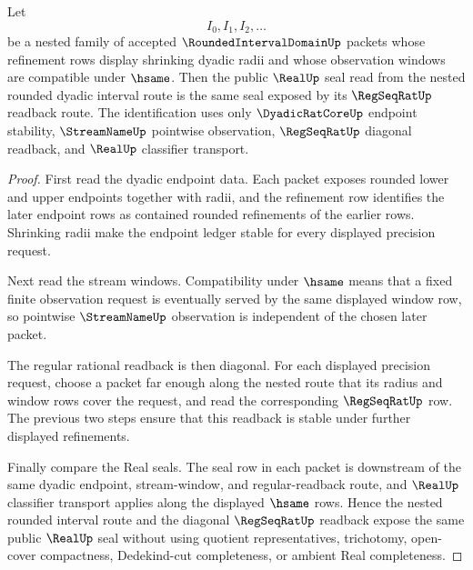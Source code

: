 \begin{theorem}
\label{thm:rounded-interval-domain-cauchy-readback}
Let
$$
I_0,I_1,I_2,\ldots
$$
be a nested family of accepted $\RoundedIntervalDomainUp$ packets whose refinement rows display shrinking dyadic radii and whose observation windows are compatible under $\hsame$. Then the public $\RealUp$ seal read from the nested rounded dyadic interval route is the same seal exposed by its $\RegSeqRatUp$ readback route. The identification uses only $\DyadicRatCoreUp$ endpoint stability, $\StreamNameUp$ pointwise observation, $\RegSeqRatUp$ diagonal readback, and $\RealUp$ classifier transport.
\end{theorem}
\begin{proof}
First read the dyadic endpoint data. Each packet exposes rounded lower and upper endpoints together with radii, and the refinement row identifies the later endpoint rows as contained rounded refinements of the earlier rows. Shrinking radii make the endpoint ledger stable for every displayed precision request.

Next read the stream windows. Compatibility under $\hsame$ means that a fixed finite observation request is eventually served by the same displayed window row, so pointwise $\StreamNameUp$ observation is independent of the chosen later packet.

The regular rational readback is then diagonal. For each displayed precision request, choose a packet far enough along the nested route that its radius and window rows cover the request, and read the corresponding $\RegSeqRatUp$ row. The previous two steps ensure that this readback is stable under further displayed refinements.

Finally compare the Real seals. The seal row in each packet is downstream of the same dyadic endpoint, stream-window, and regular-readback route, and $\RealUp$ classifier transport applies along the displayed $\hsame$ rows. Hence the nested rounded interval route and the diagonal $\RegSeqRatUp$ readback expose the same public $\RealUp$ seal without using quotient representatives, trichotomy, open-cover compactness, Dedekind-cut completeness, or ambient Real completeness.
\end{proof}


